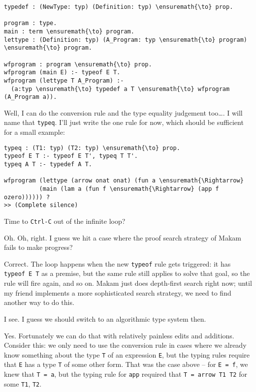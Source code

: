 \begin{verbatim}
typedef : (NewType: typ) (Definition: typ) \ensuremath{\to} prop.

program : type. 
main : term \ensuremath{\to} program. 
lettype : (Definition: typ) (A_Program: typ \ensuremath{\to} program) \ensuremath{\to} program.

wfprogram : program \ensuremath{\to} prop.
wfprogram (main E) :- typeof E T.
wfprogram (lettype T A_Program) :-
  (a:typ \ensuremath{\to} typedef a T \ensuremath{\to} wfprogram (A_Program a)).
\end{verbatim}

Well, I can do the conversion rule and the type equality judgement
too\ldots{}. I will name that \texttt{typeq}. I'll just write the one
rule for now, which should be sufficient for a small example:

\begin{verbatim}
typeq : (T1: typ) (T2: typ) \ensuremath{\to} prop.
typeof E T :- typeof E T', typeq T T'.
typeq A T :- typedef A T.

wfprogram (lettype (arrow onat onat) (fun a \ensuremath{\Rightarrow}
          (main (lam a (fun f \ensuremath{\Rightarrow} (app f ozero)))))) ?
>> (Complete silence)
\end{verbatim}

\heroADVISOR{} Time to \texttt{Ctrl-C} out of the infinite loop?

\heroSTUDENT{} Oh. Oh, right. I guess we hit a case where the proof search
strategy of Makam fails to make progress?

\heroADVISOR{} Correct. The loop happens when the new \texttt{typeof} rule
gets triggered: it has \texttt{typeof\ E\ T\textquotesingle{}} as a
premise, but the same rule still applies to solve that goal, so the rule
will fire again, and so on. Makam just does depth-first search right
now; until my friend implements a more sophisticated search strategy, we
need to find another way to do this.

\heroSTUDENT{} I see. I guess we should switch to an algorithmic type system
then.

\heroADVISOR{} Yes. Fortunately we can do that with relatively painless edits
and additions. Consider this: we only need to use the conversion rule in
cases where we already know something about the type \texttt{T} of an
expression \texttt{E}, but the typing rules require that \texttt{E} has
a type \texttt{T\textquotesingle{}} of some other form. That was the
case above -- for \texttt{E\ =\ f}, we knew that \texttt{T\ =\ a}, but
the typing rule for \texttt{app} required that
\texttt{T\textquotesingle{}\ =\ arrow\ T1\ T2} for some \texttt{T1},
\texttt{T2}.

